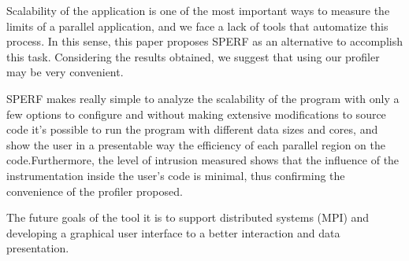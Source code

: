 \documentclass[sigconf]{acmart}
\begin{document}
Scalability of the application is one of the most important ways to measure the limits of a parallel application, and we face a lack of tools that automatize this process. In this sense, this paper proposes SPERF as an alternative to accomplish this task. Considering the results obtained, we suggest that using our profiler may be very convenient.

SPERF makes really simple to analyze the scalability of the program with only a few options to configure and without making extensive modifications to source code it's possible to run the program with different data sizes and cores, and show the user in a presentable way the efficiency of each parallel region on the code.Furthermore, the level of intrusion measured shows that the influence of the instrumentation inside the user's code is minimal, thus confirming the convenience of the profiler proposed.

The future goals of the tool it is to support distributed systems (MPI) and developing a graphical user interface to a better interaction and data presentation.





\end{document}
